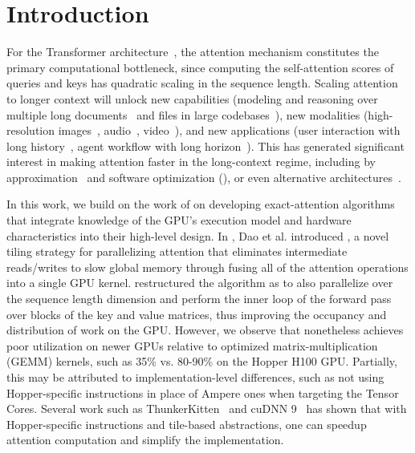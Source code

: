 \section{Introduction}
\label{sec:intro}

For the Transformer architecture~\citep{vaswani2017attention}, the attention mechanism constitutes the primary computational bottleneck, since computing the self-attention scores of queries and keys has quadratic scaling in the sequence length.
Scaling attention to longer context will unlock new capabilities (modeling and
reasoning over multiple long
documents~\citep{guo2021longt5,shaham2022scrolls,peng2023yarn} and files in
large codebases~\citep{roziere2023code, li2023starcoder}), new modalities (high-resolution
images~\citep{chen2022scaling}, audio~\citep{gulati2020conformer}, video~\citep{ho2022video}), and new applications (user interaction with long history~\citep{sun2019bert4rec},
agent workflow with long horizon~\citep{yao2022react}).
This has generated significant interest in making attention faster in the long-context regime, including 
by approximation~\citep{katharopoulos2020transformers,choromanski2020rethinking,
tay2020efficient} and software optimization
(\citep{rabe2021self,dao2022flashattention,kwon2023efficient}), or even alternative
architectures~\citep{peng2023rwkv,sun2023retentive,gu2023mamba}.

In this work, we build on the work of \citet{dao2022flashattention} on developing exact-attention algorithms that integrate knowledge of the GPU's execution model and hardware characteristics into their high-level design.
In \citep{dao2022flashattention}, Dao et al. introduced \fa, a novel tiling strategy for parallelizing attention that eliminates intermediate reads/writes to slow global memory through fusing all of the attention operations into a single GPU kernel.
\citet{dao2023flashattention2} restructured the algorithm as \faa to also parallelize over the sequence length dimension and perform the inner loop of the forward pass over blocks of the key and value matrices, thus improving the occupancy and distribution of work on the GPU.
However, we observe that \faa nonetheless achieves poor utilization on newer GPUs relative to optimized matrix-multiplication (GEMM) kernels, such as 35\% vs. 80-90\% on the Hopper H100 GPU.
Partially, this may be attributed to implementation-level differences, such as not using Hopper-specific instructions in place of Ampere ones when targeting the Tensor Cores.
Several work such as ThunkerKitten~\citep{spector2024thunder} and cuDNN 9~\citep{cudnn9} has shown that
with Hopper-specific instructions and tile-based abstractions, one can speedup
attention computation and simplify the implementation.

